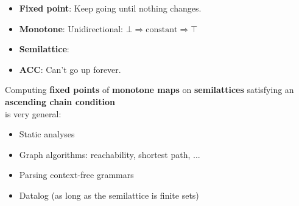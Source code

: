\documentclass{beamer}
\begin{document}

\begin{frame}


  \large
  \begin{itemize}
  \item \textbf{Fixed point}: Keep going until nothing changes.
  \item \textbf{Monotone}: Unidirectional: $\bot \Rightarrow \text{constant} \Rightarrow \top$
  \item \textbf{Semilattice}:\\

    \begin{center}\large
    \end{center}

  \item \textbf{ACC}: Can't go up forever.
  \end{itemize}

\end{frame}


\begin{frame}%

  \large Computing \textbf{fixed points} of \textbf{monotone maps} on
  \textbf{semilattices} satisfying an \textbf{ascending chain condition}\\
  is very general:

  \Large %
  \begin{itemize}
  \item Static analyses
  \item Graph algorithms: reachability, shortest path, ...
  \item Parsing context-free grammars
  \item Datalog {\large (as long as the semilattice is finite sets)}
  \end{itemize}

\end{frame}
\end{document}
